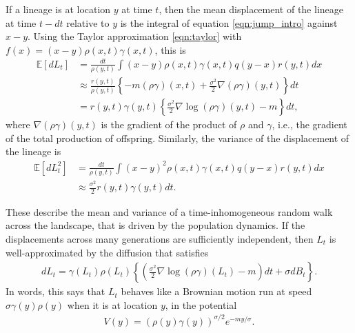 \documentclass{article}
\newcommand{\E}{\mathbb{E}}
\newcommand{\grad}{\nabla}
\begin{document}
If a lineage is at location $y$ at time $t$,
then the mean displacement of the lineage at time $t - dt$ relative to $y$
is the integral of equation \eqref{eqn:jump_intro} against $x - y$.
Using the Taylor approximation \eqref{eqn:taylor} with $f(x) = (x - y) \rho(x,t) \gamma(x,t)$,
this is
\begin{align*}
    \E[dL_t]
    &=
    \frac{dt}{\rho(y, t)} \int (x - y) \rho(x, t) \gamma(x, t) q(y - x) r(y, t) dx \\
    &\approx
    \frac{r(y, t)}{\rho(y, t)} \left\{
            - m \left( \rho \gamma \right)(x, t)
            + \frac{\sigma^2}{2} \grad\left( \rho \gamma \right)(y, t)
        \right\} dt \\
    &=
    r(y, t) \gamma(y, t) \left\{
        \frac{\sigma^2}{2} \grad \log\left(\rho \gamma \right)(y, t) 
        - m 
    \right\} dt,
\end{align*}
where $\grad(\rho \gamma)(y,t)$ is the gradient of the product of $\rho$ and $\gamma$,
i.e., the gradient of the total production of offspring.
Similarly,
the variance of the displacement of the lineage is
\begin{align*}
    \E[dL_t^2]
    &=
        \frac{dt}{\rho(y, t)} \int (x - y)^2 \rho(x, t) \gamma(x, t) q(y - x) r(y, t) dx \\
    &\approx 
        \frac{\sigma^2}{2} r(y, t) \gamma(y,t) dt .
\end{align*}

These describe the mean and variance of a time-inhomogeneous random walk across the landscape,
that is driven by the population dynamics.
If the displacements across many generations are sufficiently independent,
then $L_t$ is well-approximated by the diffusion that satisfies
\begin{align}
    dL_t = \gamma(L_t) \rho(L_t)
        \left\{
            \left( \frac{\sigma^2}{2} \grad \log \left(\rho \gamma\right)(L_t) - m \right) dt
            + \sigma dB_t
        \right\} .
\end{align}
In words, this says that $L_t$ behaves like a Brownian motion
run at speed $\sigma \gamma(y) \rho(y)$ when it is at location $y$,
in the potential
\begin{align}
    V(y) = \left(\rho(y) \gamma(y)\right)^{\sigma/2} e^{-my/\sigma} .
\end{align}
\end{document}
